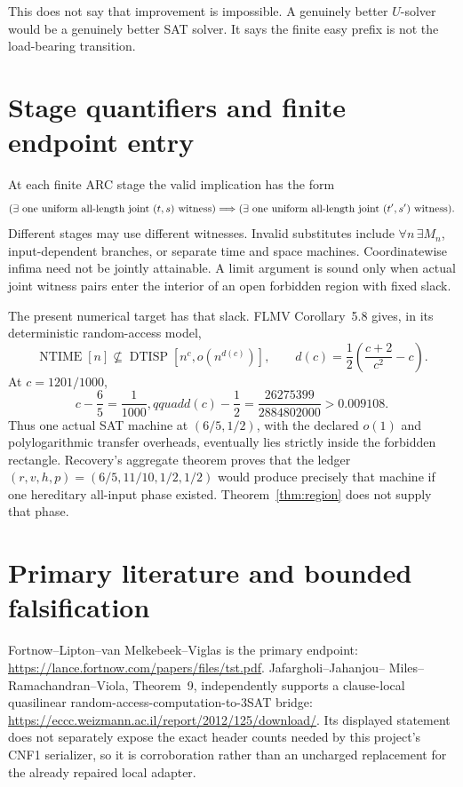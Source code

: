 \documentclass[11pt]{article}
\begin{document}
This does not say that improvement is impossible.  A genuinely better
$U$-solver would be a genuinely better SAT solver.  It says the finite easy
prefix is not the load-bearing transition.

\section{Stage quantifiers and finite endpoint entry}

At each finite ARC stage the valid implication has the form
\[
 (\exists\hbox{ one uniform all-length joint }(t,s)\hbox{ witness})
 \Longrightarrow
 (\exists\hbox{ one uniform all-length joint }(t',s')\hbox{ witness}).
\]
Different stages may use different witnesses.  Invalid substitutes include
$\forall n\,\exists M_n$, input-dependent branches, or separate time and
space machines.  Coordinatewise infima need not be jointly attainable.  A
limit argument is sound only when actual joint witness pairs enter the
interior of an open forbidden region with fixed slack.

The present numerical target has that slack.  FLMV Corollary~5.8 gives, in
its deterministic random-access model,
\[
 \operatorname{NTIME}[n]\not\subseteq
 \operatorname{DTISP}[n^c,o(n^{d(c)})],\qquad
 d(c)=\frac12\left(\frac{c+2}{c^2}-c\right).              \tag{8}
\]
At $c=1201/1000$,
\[
 c-\frac65=\frac1{1000},qquad
 d(c)-\frac12=\frac{26275399}{2884802000}>0.009108.       \tag{9}
\]
Thus one actual SAT machine at $(6/5,1/2)$, with the declared $o(1)$ and
polylogarithmic transfer overheads, eventually lies strictly inside the
forbidden rectangle.  Recovery's aggregate theorem proves that the ledger
$(r,v,h,p)=(6/5,11/10,1/2,1/2)$ would produce precisely that machine if one
hereditary all-input phase existed.  Theorem~\ref{thm:region} does not supply
that phase.

\section{Primary literature and bounded falsification}

Fortnow--Lipton--van Melkebeek--Viglas is the primary endpoint:
\url{https://lance.fortnow.com/papers/files/tst.pdf}.  Jafargholi--Jahanjou--
Miles--Ramachandran--Viola, Theorem~9, independently supports a clause-local
quasilinear random-access-computation-to-3SAT bridge:
\url{https://eccc.weizmann.ac.il/report/2012/125/download/}.  Its displayed
statement does not separately expose the exact header counts needed by this
project's CNF1 serializer, so it is corroboration rather than an uncharged
replacement for the already repaired local adapter.
\end{document}
